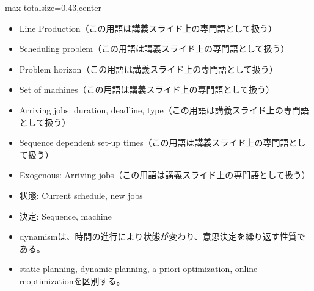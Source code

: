 \clearpage
{}
\begin{minipage}[t]{0.405\textwidth}
\begin{adjustbox}{max totalsize={\textwidth}{0.43\textheight},center}
\begin{minipage}{\textwidth}\scriptsize
{}\begin{itemize}
\item Line Production（この用語は講義スライド上の専門語として扱う）
\item Scheduling problem（この用語は講義スライド上の専門語として扱う）
\item Problem horizon（この用語は講義スライド上の専門語として扱う）
\item Set of machines（この用語は講義スライド上の専門語として扱う）
\item Arriving jobs: duration, deadline, type（この用語は講義スライド上の専門語として扱う）
\item Sequence dependent set-up times（この用語は講義スライド上の専門語として扱う）
\item Exogenous: Arriving jobs（この用語は講義スライド上の専門語として扱う）
\item 状態: Current schedule, new jobs
\item 決定: Sequence, machine
\end{itemize}\begin{itemize}
\item dynamismは、時間の進行により状態が変わり、意思決定を繰り返す性質である。
\item static planning, dynamic planning, a priori optimization, online reoptimizationを区別する。
\end{itemize}
\end{minipage}
\end{adjustbox}
\end{minipage}\hfill
